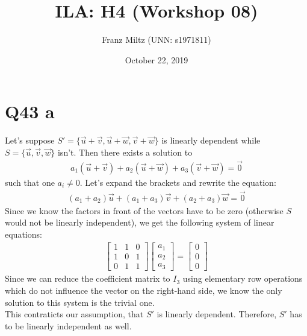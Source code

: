 \documentclass{article}
\title{ILA: H4 (Workshop 08)}
\author{Franz Miltz (UNN: s1971811)}
\date{October 22, 2019}
\begin{document}
\maketitle
\section*{Q43 a}
Let's suppose $S'=\{\vec u+\vec v, \vec u+\vec w, \vec v+\vec w\}$ is linearly dependent
while $S=\{\vec u, \vec v, \vec w\}$ isn't. Then there exists a solution to
\begin{align}
    a_1(\vec u+\vec v) + a_2(\vec u + \vec w) + a_3(\vec v + \vec w) = \vec 0
\end{align}
such that one $a_i\not=0$. Let's expand the brackets and rewrite the equation:
\begin{align}
    (a_1+a_2)\vec u + (a_1+a_3) \vec v + (a_2 + a_3) \vec w = \vec 0
\end{align}
Since we know the factors in front of the vectors have to be zero (otherwise $S$ would not be linearly independent), we get the following system of linear equations:
\begin{align}
    \begin{bmatrix}
        1 & 1 & 0 \\
        1 & 0 & 1 \\
        0 & 1 & 1
    \end{bmatrix}
    \begin{bmatrix}
        a_1 \\a_2\\a_3
    \end{bmatrix}
    = \begin{bmatrix}
        0 \\ 0 \\ 0
    \end{bmatrix}
\end{align}
Since we can reduce the coefficient matrix to $I_3$ using elementary row operations which do not influence the vector on the right-hand side, we know the only solution to this system is the trivial one.\\
This contraticts our assumption, that $S'$ is linearly dependent. Therefore, $S'$ has to be linearly independent as well.
\end{document}
